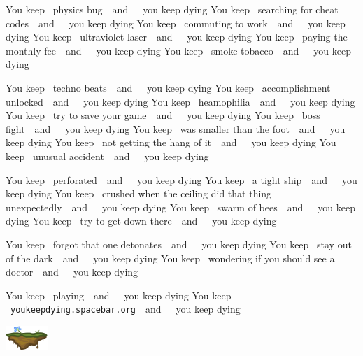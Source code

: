 \documentclass[twocolumn]{article}
\newcommand\ykd[1]{You keep ~{#1}~~and~~~you keep dying\qquad}
\begin{document}
\ykd{physics bug}
\ykd{searching for cheat codes}
\ykd{commuting to work}
\ykd{ultraviolet laser}
\ykd{paying the monthly fee}
\ykd{smoke tobacco}

\vspace{0.5in}
\ykd{techno beats}
\ykd{accomplishment unlocked}
\ykd{heamophilia}
\ykd{try to save your game}
\ykd{boss fight}
\ykd{was smaller than the foot}
\ykd{not getting the hang of it}
\ykd{unusual accident}

\ykd{perforated}
\ykd{a tight ship}
\ykd{crushed when the ceiling did that thing unexpectedly}
\ykd{swarm of bees}
\ykd{try to get down there}

\vspace{0.3in}
\ykd{forgot that one detonates}
\ykd{stay out of the dark}
\ykd{wondering if you should see a doctor}

\vspace{0.3in}
\ykd{playing}
\ykd{{\tt youkeepdying.spacebar.org}}

\vspace{0.3in}
\qquad\qquad\qquad\includegraphics[width=0.12\textwidth]{platform}
\end{document}
